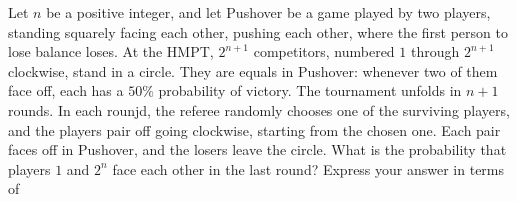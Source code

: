 Let $n$ be a positive integer, and let Pushover be a game played by two players, standing squarely facing each other, pushing each other, where the first person to lose balance loses.  At the HMPT, $2^{n+1}$ competitors, numbered $1$ through $2^{n+1}$ clockwise, stand in a circle.  They are equals in Pushover: whenever two of them face off, each has a $50\%$ probability of victory.  The tournament unfolds in $n+1$ rounds.  In each rounjd, the referee randomly chooses one of the surviving players, and the players pair off going clockwise, starting from the chosen one.  Each pair faces off in Pushover, and the losers leave the circle.  What is the probability that players $1$ and $2^n$ face each other in the last round?  Express your answer in terms of 
